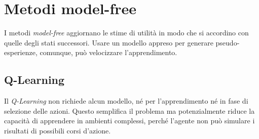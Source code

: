 \documentclass[11pt,oneside]{book}
\begin{document}
\section{Metodi model-free}
I metodi \textit{model-free} aggiornano le stime di utilità in modo che si accordino con quelle degli stati successori. Usare un modello appreso per generare pseudo-esperienze, comunque, può velocizzare l'apprendimento.

\subsection{Q-Learning}
Il \textit{Q-Learning} non richiede alcun modello, né per l'apprendimento né in fase di selezione delle azioni. Questo semplifica il problema ma potenzialmente riduce la capacità di apprendere in ambienti complessi, perché l'agente non può simulare i risultati di possibili corsi d'azione.
\end{document}
